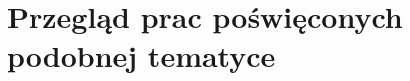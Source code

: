 \documentclass{article}
\begin{document}
	\section{Przegląd prac poświęconych podobnej tematyce}
\end{document}
